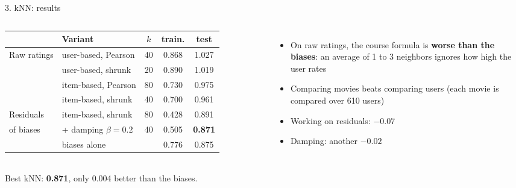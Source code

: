 \documentclass[aspectratio=169,11pt]{beamer}
\newcommand{\key}[1]{\textcolor{accent}{\textbf{#1}}}
\newcommand{\muted}[1]{\textcolor{soft}{#1}}
\newcommand{\takeaway}[1]{\vfill\begin{center}\colorbox{accent!8}{\parbox{0.9\textwidth}{\centering #1}}\end{center}}
\begin{document}
\begin{frame}{3. kNN: results}
\begin{columns}[c]
\small
\begin{tabular}{@{}llccc@{}}
\toprule
 & \textbf{Variant} & $k$ & \textbf{train.} & \textbf{test} \\
\midrule
Raw ratings & user-based, Pearson & 40 & 0.868 & 1.027 \\
 & user-based, shrunk & 20 & 0.890 & 1.019 \\
 & item-based, Pearson & 80 & 0.730 & 0.975 \\
 & item-based, shrunk & 40 & 0.700 & 0.961 \\
\midrule
Residuals & item-based, shrunk & 80 & 0.428 & 0.891 \\
of biases & + damping $\beta = 0.2$ & 40 & 0.505 & \key{0.871} \\
\midrule
 & \muted{biases alone} & & \muted{0.776} & \muted{0.875} \\
\bottomrule
\end{tabular}
\begin{itemize}\small
  \item On raw ratings, the course formula is \key{worse than the biases}: an average of 1 to 3 neighbors ignores how high the user rates
  \item Comparing movies beats comparing users (each movie is compared over 610 users)
  \item Working on residuals: $-0.07$
  \item Damping: another $-0.02$
\end{itemize}
\end{columns}
\takeaway{Best kNN: \key{0.871}, only 0.004 better than the biases.}
\end{frame}
\end{document}
